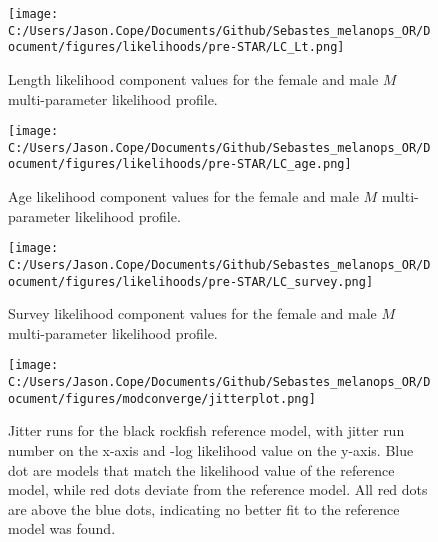 \documentclass[11pt,
  letterpaper,
]{article}
\begin{document}
\newpage

\begin{figure}
{\centering
\texttt{[image: C:/Users/Jason.Cope/Documents/Github/Sebastes\_melanops\_OR/Document/figures/likelihoods/pre-STAR/LC\_Lt.png]}
}
\caption{Length likelihood component values for the female and male $M$ multi-parameter likelihood profile.\label{fig:M-multiprofile-length-components}}
\end{figure}

\newpage

\begin{figure}
{\centering
\texttt{[image: C:/Users/Jason.Cope/Documents/Github/Sebastes\_melanops\_OR/Document/figures/likelihoods/pre-STAR/LC\_age.png]}
}
\caption{Age likelihood component values for the female and male $M$ multi-parameter likelihood profile.\label{fig:M-multiprofile-age-components}}
\end{figure}

\newpage

\begin{figure}
{\centering
\texttt{[image: C:/Users/Jason.Cope/Documents/Github/Sebastes\_melanops\_OR/Document/figures/likelihoods/pre-STAR/LC\_survey.png]}
}
\caption{Survey likelihood component values for the female and male $M$ multi-parameter likelihood profile.\label{fig:M-multiprofile-survey-components}}
\end{figure}

\newpage

\begin{figure}
{\centering
\texttt{[image: C:/Users/Jason.Cope/Documents/Github/Sebastes\_melanops\_OR/Document/figures/modconverge/jitterplot.png]}
}
\caption{Jitter runs for the black rockfish reference model, with jitter run number on the x-axis and -log likelihood value on the y-axis. Blue dot are models that match the likelihood value of the reference model, while red dots deviate from the reference model. All red dots are above the blue dots, indicating no better fit to the reference model was found.\label{fig:jitter}}
\end{figure}
\end{document}
